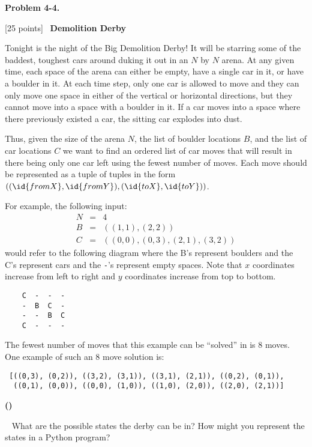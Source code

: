 \documentclass[12pt,oneside]{article}
\makeatletter
\newcounter{problemnum}
\newcommand{\theproblem}{Problem \theproblemsetnum-\theproblemnum}
\newenvironment{problems}{
        \begin{list}{{\bf \theproblem. \hspace*{0.5em}}}
        {\setlength{\leftmargin}{0em}
         \setlength{\rightmargin}{0em}
         \setlength{\labelwidth}{0em}
         \setlength{\labelsep}{0em}
         \usecounter{problemnum}}}{\end{list}}
\newcommand{\problem}[1][{}]{\item \let\@currentlabel=\theproblem \textbf{#1}}
\newcounter{problempartnum}[problemnum]
\newenvironment{problemparts}{
        \begin{list}{{\bf (\alph{problempartnum})}}
        {\setlength{\leftmargin}{2.5em}
         \setlength{\rightmargin}{2.5em}
         \setlength{\labelsep}{0.5em}}}{\end{list}}
\newcommand{\problempart}{\addtocounter{problempartnum}{1}\item}
\newcommand{\points}[1]{[#1 points]\ }
\newcommand{\theproblemsetnum}{4}
\renewcommand{\theproblemnum}{4}
\makeatother
\begin{document}
\begin{problems}

\problem \points{25} \textbf{Demolition Derby}

Tonight is the night of the Big Demolition Derby! It will be starring
some of the baddest, toughest cars around duking it out in an $N$ by
$N$ arena. At any given time, each space of the arena can either be
empty, have a single car in it, or have a boulder in it. At each time
step, only one car is allowed to move and they can only move one space
in either of the vertical or horizontal directions, but they cannot
move into a space with a boulder in it. If a car moves into a space
where there previously existed a car, the sitting car explodes into
dust.

Thus, given the size of the arena $N$, the list of boulder locations
$B$, and the list of car locations $C$ we want to find an ordered list
of car moves that will result in there being only one car left using the
fewest number of moves. Each move should be represented as a tuple of
tuples in the form $((\id{fromX},\id{fromY}), (\id{toX},\id{toY}))$.

For example, the following input:
%
\begin{eqnarray*}
  N &=& 4 \\
  B &=& ( (1,1), (2,2) ) \\
  C &=& ((0,0), (0,3), (2,1), (3,2))
\end{eqnarray*}
%
 would refer to the following diagram where the B's represent boulders and the C's represent cars and the \texttt{-}'s represent empty spaces. Note that $x$ coordinates increase from left to right and $y$ coordinates increase from top to bottom.
\begin{verbatim}
    C  -  -  -
    -  B  C  -
    -  -  B  C
    C  -  -  -
\end{verbatim}
The fewest number of moves that this example can be ``solved'' in is
$8$ moves. One example of such an $8$ move solution is:
\begin{verbatim}
 [((0,3), (0,2)), ((3,2), (3,1)), ((3,1), (2,1)), ((0,2), (0,1)),
  ((0,1), (0,0)), ((0,0), (1,0)), ((1,0), (2,0)), ((2,0), (2,1))]
\end{verbatim}

\begin{problemparts}
\problempart \points{2}
What are the possible states the derby can be in? How might you represent the states in a Python program?



\end{problemparts}
\end{problems}
\end{document}
